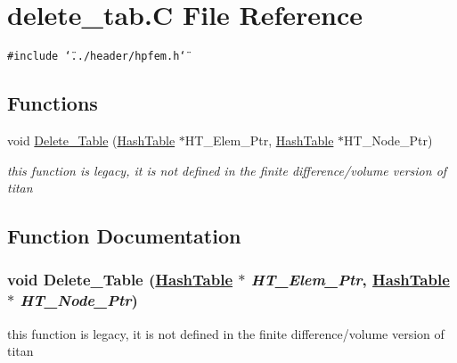 \hypertarget{delete__tab_8C}{
\section{delete\_\-tab.C File Reference}
\label{delete__tab_8C}
}
{\tt \#include \char`\"{}../header/hpfem.h\char`\"{}}\par
\subsection*{Functions}
\begin{CompactItemize}
\item 
void \hyperlink{delete__tab_8C_a0}{Delete\_\-Table} (\hyperlink{classHashTable}{Hash\-Table} $\ast$HT\_\-Elem\_\-Ptr, \hyperlink{classHashTable}{Hash\-Table} $\ast$HT\_\-Node\_\-Ptr)
\begin{CompactList}\small\item\em this function is legacy, it is not defined in the finite difference/volume version of titan \item\end{CompactList}\end{CompactItemize}


\subsection{Function Documentation}
\hypertarget{delete__tab_8C_a0}{
\subsubsection[Delete\_\-Table]{\setlength{\rightskip}{0pt plus 5cm}void Delete\_\-Table (\hyperlink{classHashTable}{Hash\-Table} $\ast$ {\em HT\_\-Elem\_\-Ptr}, \hyperlink{classHashTable}{Hash\-Table} $\ast$ {\em HT\_\-Node\_\-Ptr})}}
\label{delete__tab_8C_a0}


this function is legacy, it is not defined in the finite difference/volume version of titan 

